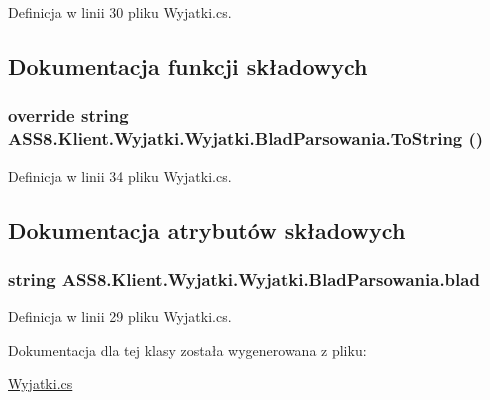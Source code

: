 Definicja w linii 30 pliku Wyjatki.cs.

\subsection{Dokumentacja funkcji składowych}
\hypertarget{a00033_541d37cb8f9616727ba8d9b695cfcd08}{
\subsubsection[{ToString}]{\setlength{\rightskip}{0pt plus 5cm}override string ASS8.Klient.Wyjatki.Wyjatki.BladParsowania.ToString ()}}
\label{d0/dc0/a00033_541d37cb8f9616727ba8d9b695cfcd08}




Definicja w linii 34 pliku Wyjatki.cs.

\subsection{Dokumentacja atrybutów składowych}
\hypertarget{a00033_19ce01427127765c40af0301cf1f9d05}{
\subsubsection[{blad}]{\setlength{\rightskip}{0pt plus 5cm}string ASS8.Klient.Wyjatki.Wyjatki.BladParsowania.blad}}
\label{d0/dc0/a00033_19ce01427127765c40af0301cf1f9d05}




Definicja w linii 29 pliku Wyjatki.cs.

Dokumentacja dla tej klasy została wygenerowana z pliku:\begin{CompactItemize}
\item 
\hyperlink{a00053}{Wyjatki.cs}\end{CompactItemize}
